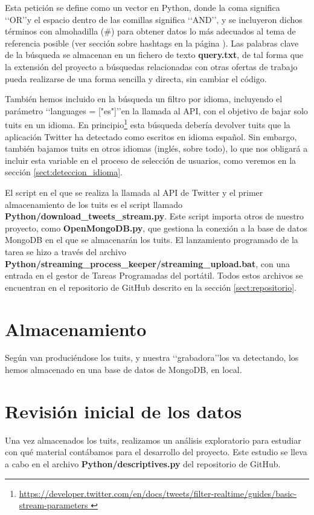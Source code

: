 Esta petición se define como un vector en Python, donde la coma significa \lq\lq OR\rq\rq y el espacio
dentro de las comillas significa \lq\lq AND\rq\rq, y se incluyeron dichos términos con almohadilla 
(\#) para obtener datos lo más adecuados al tema de referencia posible
(ver sección sobre hashtags en la página \pageref{sect:hashtags}). Las palabras clave de la búsqueda se almacenan en un fichero de texto {\bf query.txt},
de tal forma que la extensión del proyecto a búsquedas relacionadas con otras ofertas de trabajo
pueda realizarse de una forma sencilla y directa, sin cambiar el código.

También hemos incluido en la búsqueda un filtro por idioma, incluyendo el parámetro 
\lq\lq languages = ["es"]\rq\rq en la llamada al API, con el objetivo de bajar solo tuits
en un idioma. En principio\footnote{\url{https://developer.twitter.com/en/docs/tweets/filter-realtime/guides/basic-stream-parameters }}
esta búsqueda debería devolver tuits que la aplicación Twitter ha detectado como escritos en
idioma español. Sin embargo, también bajamos tuits en otros idiomas (inglés, sobre todo), lo que
nos obligará a incluir esta variable en el proceso de selección de usuarios, como veremos en la sección 
\ref{sect:deteccion_idioma}.

El script en el que se realiza la llamada al API de Twitter y el primer almacenamiento de los tuits
es el script llamado {\bf Python/download\_tweets\_stream.py}. Este script importa otros
de nuestro proyecto, como {\bf OpenMongoDB.py}, que gestiona la conexión a la base de datos MongoDB
en el que se almacenarán los tuits. El lanzamiento programado de la tarea se hizo a través del archivo {\bf Python/streaming\_process\_keeper/streaming\_upload.bat}, con una entrada en el gestor
de Tareas Programadas del portátil. Todos estos
archivos se encuentran en el repositorio de GitHub descrito en la sección \ref{sect:repositorio}.


\section{Almacenamiento}
Según van produciéndose los tuits, y nuestra \lq\lq grabadora\rq\rq los va detectando, los hemos almacenado
en una base de datos de MongoDB, en local.


\section{Revisión inicial de los datos}
Una vez almacenados los tuits, realizamos un análisis exploratorio para estudiar con qué material contábamos para el desarrollo del proyecto. Este estudio se lleva a cabo en el archivo {\bf Python/descriptives.py} del repositorio de
GitHub.

